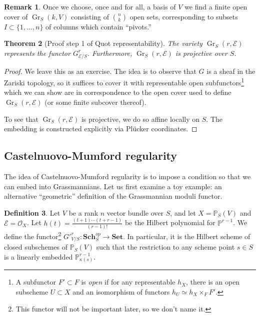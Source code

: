 \documentclass[10pt]{article}
\newtheorem{thm}{Theorem}[section]
\theoremstyle{definition}
\newtheorem{defn}[thm]{Definition}
\newtheorem{rmk}[thm]{Remark}
\newcommand{\cat}{\mathbf}
\newcommand{\PP}{\mathbb{P}}
\DeclareMathOperator{\Gr}{Gr}
\newcommand{\OO}{\mathcal{O}}
\newcommand{\todo}[1]{\textbf{\textcolor{red}{TODO #1}}}
\begin{document}
\begin{rmk}
Once we choose, once and for all, a basis of $V$ we find a finite open cover of $\Gr_S(k, V)$ consisting of $\binom{n}{k}$ open sets, corresponding to subsets $I \subset \{1, \ldots, n\}$ of columns which contain ``pivots.''
\end{rmk}

\begin{thm}[Proof step 1 of Quot representability]
The variety $\Gr_S(r, \mathcal{E})$ represents the functor $G^r_{\mathcal{E}/S}$.  Furthermore, $\Gr_S(r, \mathcal{E})$ is projective over $S$.
\end{thm}
\begin{proof}
We leave this as an exercise.  The idea is to observe that $G$ is a sheaf in the Zariski topology, so it suffices to cover it with representable open subfunctors\footnote{A subfunctor $F' \subset F$ is \emph{open} if for any representable $h_X$, there is an open subscheme $U \subset X$ and an isomorphism of functors $h_U \simeq h_X \times_F F'$.} which we can show are in correspondence to the open cover used to define $\Gr_S(r, \mathcal{E})$ (or some finite subcover thereof).




To see that $\Gr_S(r, \mathcal{E})$ is projective, we do so affine locally on $S$.  The embedding is constructed explicitly via Pl\"ucker coordinates.
\end{proof}




\subsection{Castelnuovo-Mumford regularity}

The idea of Castelnuovo-Mumford regularity is to impose a condition so that we can embed into Grassmannians.  Let us first examine a toy example: an alternative ``geometric'' definition of the Grassmannian moduli functor.
\begin{defn}
Let $V$ be a rank $n$ vector bundle over $S$, and let $X = \mathbb{P}_S(V)$ and $\mathcal{E} = \OO_X$.  Let $h(t) = \frac{(t+1)\cdots(t+r-1)}{(r-1)!}$ be the Hilbert polynomial for $\PP^{r-1}$.  We define the functor\footnote{This functor will not be important later, so we don't name it.} $G'^r_{V/S}: \cat{Sch}^{op}_S \rightarrow \cat{Set}$.  In particular, it is the Hilbert scheme of closed subschemes of $\PP_S(V)$ such that the restriction to any scheme point $s \in S$ is a linearly embedded $\mathbb{P}^{r-1}_{\kappa(s)}$.
\end{defn}
\end{document}
